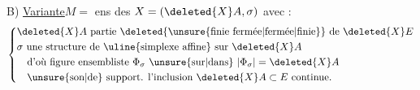 B) \uline{Variante}\quad $M={}$ ens des   $X=(\deleted{X}A,\sigma)$ avec :
\[
\left\{\begin{aligned}
&\deleted{X}A\ \text{partie \deleted{\unsure{finie fermée|fermée|finie}} de }\deleted{X}E\\
&\sigma\ \text{une structure de \uline{simplexe affine} sur }\deleted{X}A\\
&\quad\text{d'où figure ensembliste }\Phi_\sigma\ \text{\unsure{sur|dans} }|\Phi_\sigma|=\deleted{X}A\\
&\quad\text{\unsure{son|de} support. l'inclusion }\deleted{X}A\subset E\ \text{continue.}
\end{aligned}\right.
\]
